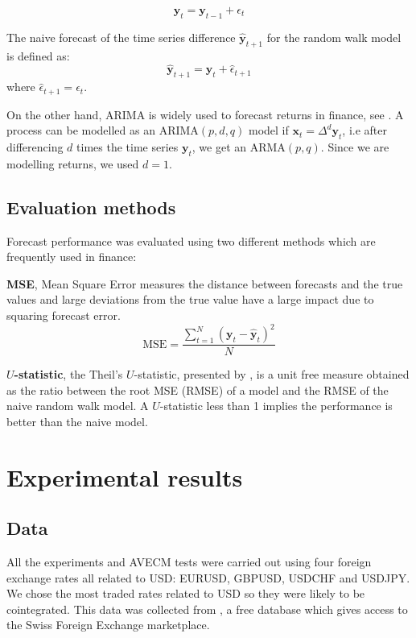 \begin{equation}
\mathbf{y}_t = \mathbf{y}_{t-1} + \epsilon_{t}
\label{rwmodel}
\end{equation}

The naive forecast of the time series difference $\hat{\mathbf{y}}_{t+1}$ for
the random walk model is defined as:
\begin{equation}
\hat{\mathbf{y}}_{t+1} = \mathbf{y}_t + \hat{\epsilon}_{t+1} 
\end{equation}
\noindent where  $\hat{\epsilon}_{t+1} = \epsilon_{t}$.

On the other hand, ARIMA is widely used to forecast returns in finance, see
\cite{tsay2005}. A process can be modelled as an ARIMA$(p,d,q)$ model if
$\mathbf{x}_t=\Delta^d \mathbf{y}_t $, i.e after differencing $d$ times the time
series $\mathbf{y}_t$,  we get an ARMA$(p,q)$. Since we are modelling returns,
we used $d=1$.


\subsection{Evaluation methods} \label{sec:evaluation}

Forecast performance was evaluated using two different methods which are
frequently used in finance:
\begin{description}
\item
{\bf MSE},  Mean Square Error measures the distance between forecasts
and the true values and large deviations from the true value have a
large impact due to squaring forecast error.
\begin{equation}\label{eq:MSE}
\text{MSE} = 
\frac{\displaystyle \sum_{t=1}^{N} (\mathbf{y}_t-\hat{\mathbf{y}}_t)^2}{N}
\end{equation}
\item {\bf $U$-statistic}, the Theil's $U$-statistic, presented by
\cite{theil1966}, is a unit free measure obtained as the ratio between the root
MSE (RMSE) of a model and the RMSE of the naive random walk model. A
$U$-statistic less than 1 implies the performance is better than the naive
model.
\end{description}


\section{Experimental results}
\label{sec:results}
\subsection{Data} \label{sec:unitroot}
All the experiments and AVECM tests were carried out using four foreign exchange rates all related to
USD: EURUSD, GBPUSD, USDCHF and USDJPY. We chose the most traded rates related
to USD so they were likely to be cointegrated. 
This data was collected from
\cite{Dukascopy2014}, a free database which gives access to the Swiss Foreign
Exchange marketplace.

